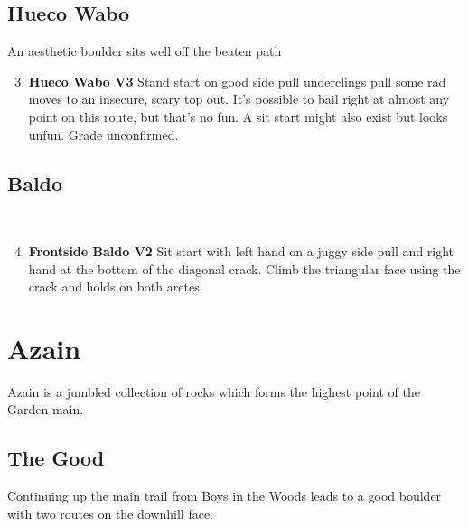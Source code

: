 \begin{multicols*}{2}
			\subsection*{Hueco Wabo}\label{bf:Hueco Wabo}
			An aesthetic boulder sits well off the beaten path
			
				\begin{enumerate}[]
					\setcounter{enumi}{2}
					\item\label{rt:Hueco Wabo} \colorbox{green!20}{\textbf{Hueco Wabo V3  } }
					\newline Stand start on good side pull underclings pull some rad moves to an insecure, scary top out. It's possible to bail right at almost any point on this route, but that's no fun. A sit start might also exist but looks unfun. Grade unconfirmed.\
				\end{enumerate}

			\subsection*{Baldo}\label{bf:Baldo}
			\
			
				\begin{enumerate}[]
					\setcounter{enumi}{3}
					\item\label{rt:Frontside Baldo} \colorbox{green!20}{\textbf{Frontside Baldo V2    } }
					\newline Sit start with left hand on a juggy side pull and right hand at the bottom of the diagonal crack. Climb the triangular face using the crack and holds on both aretes.\
				\end{enumerate}
		\section{Azain}\label{sa:Azain}
	Azain is a jumbled collection of rocks which forms the highest point of the Garden main.

			\subsection*{The Good}\label{bf:The Good}
			Continuing up the main trail from Boys in the Woods leads to a good boulder with two routes on the downhill face.
			

\end{multicols*}

